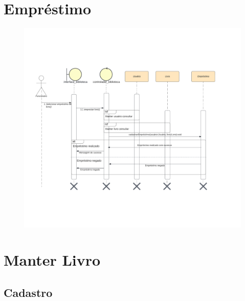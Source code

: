 \newpage


\section{Empréstimo} 

\begin{figure}[h]
    \centering
    \includegraphics[width=1.0\linewidth]{Imagens/Emprestimo-sequencia.pdf}
\end{figure}

\newpage


\section{Manter Livro} 

\subsection{Cadastro}

